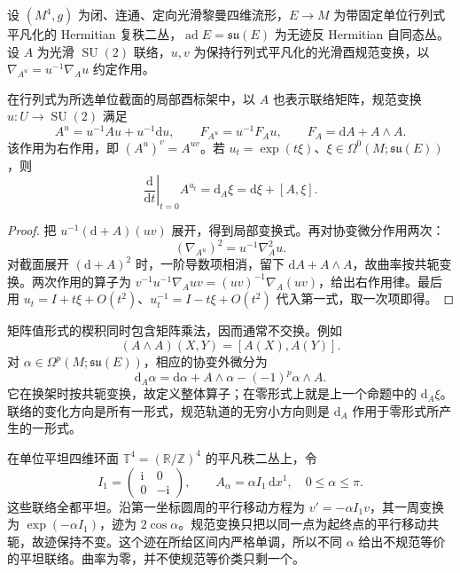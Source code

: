 \begin{proposition}\label{g3:prop:B-gauge-action}
	设 \((M^4,g)\) 为闭、连通、定向光滑黎曼四维流形，\(E\to M\) 为带固定单位行列式平凡化的 Hermitian 复秩二丛，\(\operatorname{ad}E=\mathfrak{su}(E)\) 为无迹反 Hermitian 自同态丛。
	设 \(A\) 为光滑 \(\operatorname{SU}(2)\) 联络，\(u,v\) 为保持行列式平凡化的光滑酉规范变换，以 \(\nabla_{A^u}=u^{-1}\nabla_Au\) 约定作用。

	在行列式为所选单位截面的局部酉标架中，以 \(A\) 也表示联络矩阵，规范变换 \(u:U\to\operatorname{SU}(2)\) 满足
	\begin{equation}\label{g3:eq:B-gauge-transform}
		A^u=u^{-1}Au+u^{-1}\mathrm du,\qquad
		F_{A^u}=u^{-1}F_Au,\qquad
		F_A=\mathrm dA+A\wedge A.
	\end{equation}
	该作用为右作用，即 \((A^u)^v=A^{uv}\)。若
	\(u_t=\exp(t\xi)\)、\(\xi\in\Omega^0(M;\mathfrak{su}(E))\)，则
	\[
		\left.\frac{\mathrm d}{\mathrm dt}\right|_{t=0}A^{u_t}
		=\mathrm d_A\xi=\mathrm d\xi+[A,\xi].
	\]
\end{proposition}
\begin{proof}
	把 \(u^{-1}(\mathrm d+A)(uv)\) 展开，得到局部变换式。再对协变微分作用两次：
	\[
		(\nabla_{A^u})^2=u^{-1}\nabla_A^2u.
	\]
	对截面展开 \((\mathrm d+A)^2\) 时，一阶导数项相消，留下 \(\mathrm dA+A\wedge A\)，故曲率按共轭变换。两次作用的算子为
	\(v^{-1}u^{-1}\nabla_Auv=(uv)^{-1}\nabla_A(uv)\)，给出右作用律。最后用
	\(u_t=I+t\xi+O(t^2)\)、\(u_t^{-1}=I-t\xi+O(t^2)\) 代入第一式，取一次项即得。
\end{proof}

矩阵值形式的楔积同时包含矩阵乘法，因而通常不交换。例如
\[
	(A\wedge A)(X,Y)=[A(X),A(Y)].
\]
对 \(\alpha\in\Omega^p(M;\mathfrak{su}(E))\)，相应的协变外微分为
\begin{equation}\label{g3:eq:B-covariant-exterior-derivative}
	\mathrm d_A\alpha
	=\mathrm d\alpha+A\wedge\alpha-(-1)^p\alpha\wedge A.
\end{equation}
它在换架时按共轭变换，故定义整体算子；在零形式上就是上一个命题中的 \(\mathrm d_A\xi\)。联络的变化方向是所有一形式，规范轨道的无穷小方向则是 \(\mathrm d_A\) 作用于零形式所产生的一形式。

\begin{example}\label{g3:exm:B-flat-torus-gauge}
	在单位平坦四维环面 \(\mathbb T^4=(\mathbb R/\mathbb Z)^4\) 的平凡秩二丛上，令
	\[
		I_1=\begin{pmatrix}\mathrm i&0\\0&-\mathrm i\end{pmatrix},
		\qquad A_\alpha=\alpha I_1\,\mathrm dx^1,\quad 0\le\alpha\le\pi.
	\]
	这些联络全都平坦。沿第一坐标圆周的平行移动方程为
	\(v'=-\alpha I_1v\)，其一周变换为 \(\exp(-\alpha I_1)\)，迹为 \(2\cos\alpha\)。规范变换只把以同一点为起终点的平行移动共轭，故迹保持不变。这个迹在所给区间内严格单调，所以不同 \(\alpha\) 给出不规范等价的平坦联络。曲率为零，并不使规范等价类只剩一个。
\end{example}

